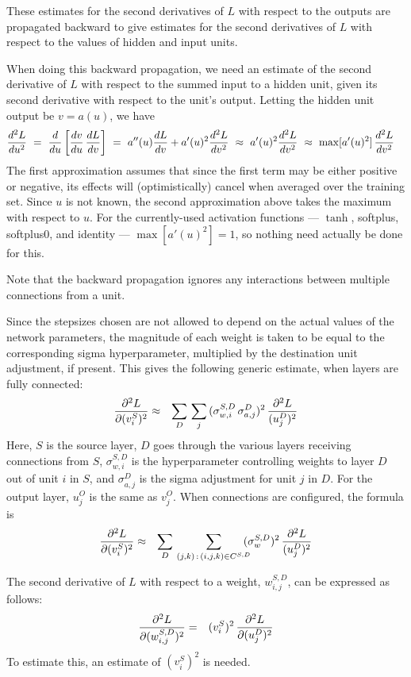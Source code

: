 \documentclass{report}[11pt]
\def\beq{\begin{eqnarray}}
\def\eeq{\end{eqnarray}}
\def\eep{\end{eqnarray}}
\begin{document}
These estimates for the second derivatives of $L$ with respect to the
outputs are propagated backward to give estimates for the second
derivatives of $L$ with respect to the values of hidden and input
units.  

When doing this backward propagation, we need an estimate of the
second derivative of $L$ with respect to the summed input to a
hidden unit, given its second derivative with respect to the unit's
output.  Letting the hidden unit output be $v = a(u)$, we have\beq
  {d^2L \over du^2}
   \ = \ {d \over du} \left[ {dv \over du}\, {dL \over dv} \right] 
   \ = \ a''(u) {dL \over dv} + a'(u)^2 {d^2L \over dv^2}
   \ \approx \ a'(u)^2 {d^2L \over dv^2} 
   \ \approx \ \max[a'(u)^2]\, {d^2L \over dv^2}\ \ \
\eeq%
The first approximation assumes that since the first term may be either
positive or negative, its effects will (optimistically) cancel when
averaged over the training set.  Since $u$ is not known, the second
approximation above takes the maximum with respect to $u$.  
For the currently-used activation functions --- $\tanh$, softplus, 
softplus0, and identity --- $\max[a'(u)^2] = 1$, so nothing need actually
be done for this.

Note that the backward propagation ignores any interactions between
multiple connections from a unit.

Since the stepsizes chosen are not allowed to depend on the actual
values of the network parameters, the magnitude of each weight is
taken to be equal to the corresponding sigma hyperparameter,
multiplied by the destination unit adjustment, if present.  This gives
the following generic estimate, when layers are fully connected:\beq
  {\partial^2 L \over \partial (v^S_i)^2} & \approx &
     \sum_D\, \sum_j\, (\sigma^{S,D}_{w,i}\, \sigma^D_{a,j})^2\, 
     {\partial^2 L \over (u^D_j)^2}
\eeq%
Here, $S$ is the source layer, $D$ goes through the various layers
receiving connections from $S$, $\sigma^{S,D}_{w,i}$ is the
hyperparameter controlling weights to layer $D$ out of unit $i$ in
$S$, and $\sigma^D_{a,j}$ is the sigma adjustment for unit $j$ in $D$.
For the output layer, $u^O_j$ is the same as $v^O_j$.
When connections are configured, the formula is
\beq
  {\partial^2 L \over \partial (v^S_i)^2} & \approx &
     \sum_D\, \sum_{(j,k)\,:\,(i,j,k)\in C^{S,D}}\!\!\!\!
       (\sigma^{S,D}_w)^2\, {\partial^2 L \over (u^D_j)^2}
\eep
     
The second derivative of $L$ with respect to a weight, $w^{S,D}_{i,j}$,
can be expressed as follows:\beq
  {\partial^2 L \over \partial (w^{S,D}_{i,j})^2} & = &
    (v^S_i)^2\,{\partial^2 L \over \partial (u^D_j)^2}
\eeq%
To estimate this, an estimate of $(v^S_i)^2$ is needed.
\end{document}
